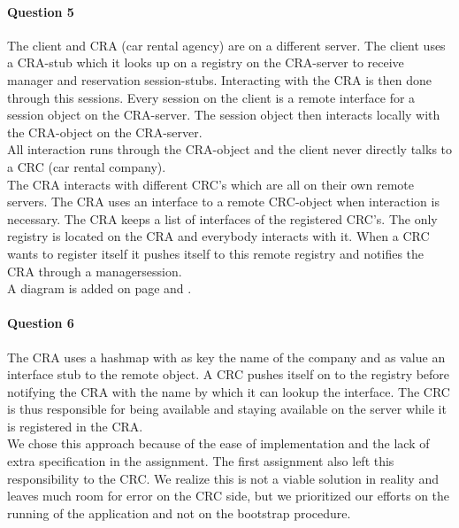\documentclass{ds-report}
\begin{document}
	\paragraph{Question 5} 
	The client and CRA (car rental agency) are on a different server. The client uses a CRA-stub which it looks up on a registry on the CRA-server to receive manager and reservation session-stubs. Interacting with the CRA is then done through this sessions. Every session on the client is a remote interface for a session object on the CRA-server. The session object then interacts locally with the CRA-object on the CRA-server. \\
	
	All interaction runs through the CRA-object and the client never directly talks to a CRC (car rental company). \\
	
	The CRA interacts with different CRC's which are all on their own remote servers. The CRA uses an interface to a remote CRC-object when interaction is necessary. The CRA keeps a list of interfaces of the registered CRC's. The only registry is located on the CRA and everybody interacts with it. When a CRC wants to register itself it pushes itself to this remote registry and notifies the CRA through a managersession. \\
	
	A diagram is added on page \pageref{designreport1} and \pageref{designreport2}.
	
	\paragraph{Question 6} 
	The CRA uses a hashmap with as key the name of the company and as value an interface stub to the remote object. A CRC pushes itself on to the registry before notifying the CRA with the name by which it can lookup the interface. The CRC is thus responsible for being available and staying available on the server while it is registered in the CRA.\\
	
	We chose this approach because of the ease of implementation and the lack of extra specification in the assignment.
	The first assignment also left this responsibility to the CRC.
	We realize this is not a viable solution in reality and leaves much room for error on the CRC side, but we prioritized our efforts on the running of the application and not on the bootstrap procedure.
	
\end{document}
